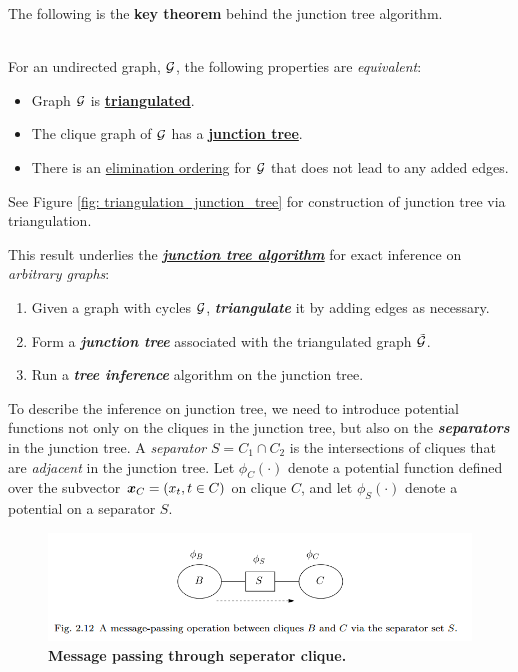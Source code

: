 \documentclass[11pt]{article}
\begin{document}
The following is the \textbf{key theorem} behind the junction tree algorithm.
\begin{theorem}\citep{jordan2003introduction, wainwright2008graphical}\\
For an undirected graph, ${\mathcal G}$, the following properties are \emph{equivalent}:
\begin{itemize}
\item Graph ${\mathcal G}$ is \underline{\textbf{triangulated}}.
\item The clique graph of ${\mathcal G}$ has a \underline{\textbf{junction tree}}.
\item There is an \underline{elimination ordering} for ${\mathcal G}$ that does not lead to any added edges.
\end{itemize}
\end{theorem} See Figure \ref{fig: triangulation_junction_tree} for construction of junction tree via triangulation.


This result underlies the  \underline{\textbf{\emph{junction tree algorithm}}}  \citep{jordan2003introduction} for exact inference on \emph{arbitrary graphs}:
\begin{enumerate}
\item Given a graph with cycles ${\mathcal G}$, \emph{\textbf{triangulate}} it by adding edges as necessary.

\item Form a \emph{\textbf{junction tree}} associated with the triangulated graph $\tilde{{\mathcal G}}$.

\item Run a \emph{\textbf{tree inference}} algorithm on the junction tree.
\end{enumerate}

To describe the inference on junction tree, we need to introduce potential functions not only on the cliques in the junction tree, but also on the \emph{\textbf{separators}} in the junction tree. A \emph{separator} $S= C_1 \cap C_2$ is the intersections of cliques that are \emph{adjacent} in the junction tree. Let $\phi_{C}(\cdot)$ denote a potential function defined over the subvector $\boldsymbol{x}_C = (x_t, t \in C)$ on clique $C$, and let $\phi_{S}(\cdot)$ denote a potential on a separator $S$. 

\begin{figure}
\begin{minipage}[t]{1\linewidth}
  \centering
  \centerline{\includegraphics[scale = 0.5]{message_passing_separator.png}}
\end{minipage}
\caption{\footnotesize{\textbf{Message passing through seperator clique.}}}
\label{fig: message_passing_separator}
\end{figure}
\end{document}
